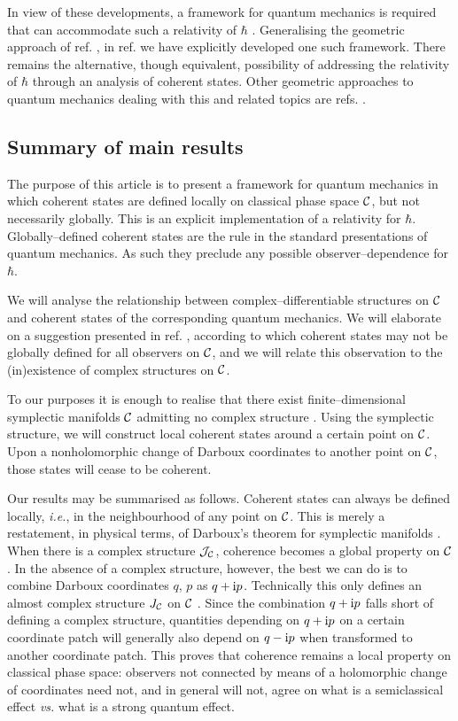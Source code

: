 \documentclass[a4paper,a4paper]{article}
\begin{document}
In view of these developments, a framework for quantum mechanics 
is required that can accommodate such a relativity of $\hbar$ \cite{VAFA}.
Generalising the geometric approach of ref. \cite{ASHTEKAR}, 
in ref. \cite{ME} we have explicitly developed one such framework. 
There remains the alternative, though equivalent, possibility of addressing 
the relativity of $\hbar$ through an analysis of coherent states.
Other geometric approaches to quantum mechanics dealing with this and 
related topics are refs. 
\cite{ANANDAN, MATONE, FH, GEOMKLAUDER, MILANO, TIWARI, MEX}.

\subsection{Summary of main results}\label{suma}

The purpose of this article is to present a framework for quantum mechanics in which
coherent states are defined locally on classical phase space ${\cal C}$, 
but not necessarily globally. This is an explicit implementation of a relativity for $\hbar$.
Globally--defined coherent states are the rule in the standard 
presentations of quantum mechanics. As such they preclude any possible 
observer--dependence for $\hbar$.

We will analyse the relationship between complex--differentiable structures
on ${\cal C}$ and coherent states of the corresponding quantum mechanics. 
We will elaborate on a suggestion presented in ref. \cite{ME}, according to which coherent 
states may not be globally defined for all observers on ${\cal C}$, 
and we will relate this observation to the (in)existence of complex structures on ${\cal C}$. 

To our purposes it is enough to realise that there exist finite--dimensional symplectic 
manifolds ${\cal C}$ admitting no complex structure \cite{MCDUFF}. 
Using the symplectic structure, we will construct local coherent states around a certain point 
on ${\cal C}$. Upon a nonholomorphic change of Darboux coordinates to another point on 
${\cal C}$, those states will cease to be coherent. 

Our results may be summarised as follows. Coherent states can always 
be defined locally, {\it i.e.}, in the neighbourhood of any point  on ${\cal C}$. 
This is merely a restatement, in physical terms, of Darboux's theorem for symplectic 
manifolds \cite{ARNOLD}. When there is a complex 
structure ${\cal J}_{\cal C}$, coherence becomes a global property on ${\cal C}$. 
In the absence of a complex structure, however, the best we can do 
is to combine Darboux coordinates $q$, $p$ as $q+{\rm i}p$. 
Technically this only defines an almost complex structure $J_{\cal C}$ on ${\cal C}$
\cite{KN}. Since the combination $q+{\rm i}p$ 
falls short of defining a complex structure, quantities depending on $q+{\rm i}p$ 
on a certain coordinate patch will generally also depend on $q-{\rm i}p$ 
when transformed to another coordinate patch. This proves that coherence remains 
a local property on classical phase space: observers not connected by means of 
a holomorphic change of coordinates need not, and in general will not,
agree on what is a semiclassical effect {\it vs.} what is a strong quantum effect. 
\end{document}

